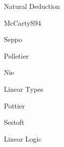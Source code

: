 \begin{pgroup}{Natural Deduction}
  \begin{paper}{McCartyS94}
    \mustread
  \end{paper}

  \begin{paper}{Seppo}
    \mustread
  \end{paper}

  \begin{paper}{Pelletier}
    \mustread
  \end{paper}

  \begin{paper}{Nie}
    \mustread
  \end{paper}
\end{pgroup}

\begin{pgroup}{Linear Types}
  \begin{paper}{Pottier}
    \mustread
  \end{paper}

  \begin{paper}{Sestoft}
    \mustread
  \end{paper}
\end{pgroup}

\begin{pgroup}{Linear Logic}
\end{pgroup}
